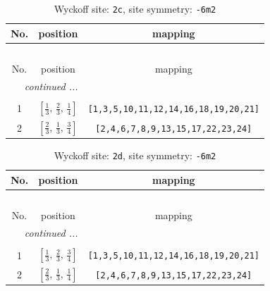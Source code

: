 \documentclass[fleqn,8pt]{jsarticle}
\begin{document}
\renewcommand{\arraystretch}{1.2}
\begin{longtable}{ccc}
\caption{Wyckoff site: {\tt 2c}, site symmetry: {\tt -6m2}}
 \\
 \hline \hline
No. & position & mapping \\ \hline \endfirsthead

\multicolumn{2}{l}{\tablename\ \thetable{}} \\
 \hline \hline
No. & position & mapping \\ \hline \endhead

 \hline \hline
\multicolumn{2}{r}{\footnotesize\it continued ...} \\ \endfoot

 \hline \hline
\multicolumn{2}{r}{} \\ \endlastfoot

1 & $\left[ \frac{1}{3},\, \frac{2}{3},\, \frac{1}{4} \right]$ & {\tt [1,3,5,10,11,12,14,16,18,19,20,21]} \\ \hline
2 & $\left[ \frac{2}{3},\, \frac{1}{3},\, \frac{3}{4} \right]$ & {\tt [2,4,6,7,8,9,13,15,17,22,23,24]} \\
\end{longtable}
\renewcommand{\arraystretch}{1.2}
\begin{longtable}{ccc}
\caption{Wyckoff site: {\tt 2d}, site symmetry: {\tt -6m2}}
 \\
 \hline \hline
No. & position & mapping \\ \hline \endfirsthead

\multicolumn{2}{l}{\tablename\ \thetable{}} \\
 \hline \hline
No. & position & mapping \\ \hline \endhead

 \hline \hline
\multicolumn{2}{r}{\footnotesize\it continued ...} \\ \endfoot

 \hline \hline
\multicolumn{2}{r}{} \\ \endlastfoot

1 & $\left[ \frac{1}{3},\, \frac{2}{3},\, \frac{3}{4} \right]$ & {\tt [1,3,5,10,11,12,14,16,18,19,20,21]} \\ \hline
2 & $\left[ \frac{2}{3},\, \frac{1}{3},\, \frac{1}{4} \right]$ & {\tt [2,4,6,7,8,9,13,15,17,22,23,24]} \\
\end{longtable}
\renewcommand{\arraystretch}{1.2}
\end{document}
